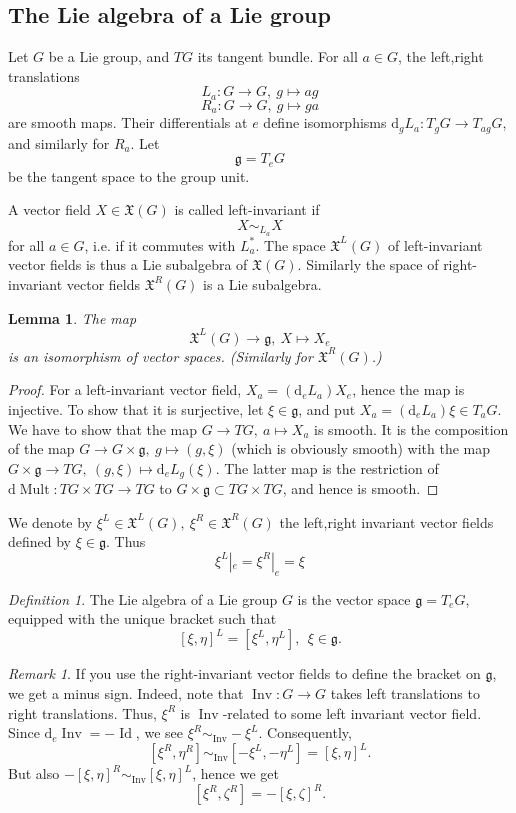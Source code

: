 \documentclass{article}
\newtheorem{lemma}[theorem]{Lemma}
\theoremstyle{remark}
\newtheorem{remark}[theorem]{Remark}
\newtheorem{definition}[theorem]{Definition}
\newcommand\lie[1]{\mathfrak{#1}}
\newcommand{\g}{\lie{g}}
\newcommand{\on}{\operatorname}
\renewcommand{\d}{{\mbox{d}}}
\newcommand{\mf}{\mathfrak}
\begin{document}
\subsection{The Lie algebra of a Lie group}
%
Let $G$ be a Lie group, and $TG$ its tangent bundle.  For all $a\in
G$, the left,right translations
%
\[ L_a\colon G\to G,\ g\mapsto ag\]
\[ R_a\colon G\to G,\ g\mapsto ga\]
%
are smooth maps. Their differentials at $e$ define isomorphisms $\d_g
L_a\colon T_g G\to T_{ag} G$, and similarly for $R_a$. Let
\[ \g=T_eG\]
be the tangent space to the group unit. 

A vector field $X\in \mf{X}(G)$ is called left-invariant if 
\[ X\sim_{L_a} X\]
for all $a\in G$, i.e. if it commutes with $L_a^*$. 
The space $\mf{X}^L(G)$ of left-invariant vector fields is thus a Lie subalgebra of 
$\mf{X}(G)$. Similarly the space of right-invariant vector fields $\mf{X}^R(G)$ is a Lie subalgebra. 

%
\begin{lemma}
The map 
\[ \mf{X}^L(G)\to \g,\ X\mapsto X_e\] 
is an isomorphism of vector 
spaces.  (Similarly for $\mf{X}^R(G)$.) 
\end{lemma}
\begin{proof}
For a left-invariant vector field, $X_a=(\d_eL_a)X_e$, hence the map 
is  injective. To show that it is surjective, let $\xi\in \g$, and 
put $X_a=(\d_eL_a)\xi \in T_a G$. We have to show that the map $G\to TG,\ 
a\mapsto X_a$ is smooth. It is the composition of the map 
$G\to G\times\g,\ g\mapsto (g,\xi)$ (which is obviously smooth) 
with the map $G\times\g\to TG,\ (g,\xi)\mapsto \d_e L_g(\xi)$. 
The latter map is the restriction of $\d\on{Mult}\colon TG\times TG\to TG$ 
to $G\times\g\subset TG\times TG$, and hence is smooth. 
\end{proof}

%
We denote by
$\xi^L\in\mf{X}^L(G),\ \xi^R\in\mf{X}^R(G)$ 
the left,right invariant vector fields defined by
$\xi\in \g$. Thus
\[ \xi^L|_e=\xi^R|_e=\xi\]
%
\begin{definition}
The Lie algebra of a Lie group $G$ is the vector space $\g=T_eG$, equipped with the unique bracket such that 
%
\[ [\xi,\eta]^L=[\xi^L,\eta^L],\ \ \xi\in\g.\]
%
\end{definition}

\begin{remark}
If you use the right-invariant vector fields to define the bracket on $\g$, we get a minus sign.
Indeed, note that $\on{Inv}\colon G\to G$ takes left translations to right translations. 
Thus, $\xi^R$ is $\on{Inv}$-related to some left invariant vector field. Since 
$\d_e\on{Inv}=-\on{Id}$, we see  
$\xi^R\sim_{\on{Inv}}-\xi^L$. Consequently, 
\[ [\xi^R,\eta^R]\sim_{\on{Inv}} [-\xi^L,-\eta^L]=[\xi,\eta]^L.\]
But also $ -[\xi,\eta]^R\sim_{\on{Inv}} [\xi,\eta]^L$, hence we get 
%
\[ [\xi^R,\zeta^R]=-[\xi,\zeta]^R.\]
%
\end{remark}
\end{document}
